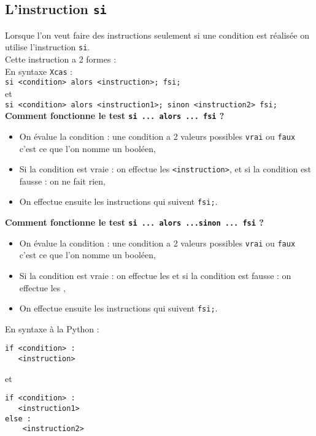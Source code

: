 \documentclass[12pt,a4paper]{book}
\begin{document}
\begin{giacjshere}
\section{L'instruction {\tt si}}\label{sec:Prix}
Lorsque l'on veut faire des instructions seulement si une condition est 
r\'ealis\'ee on utilise l'instruction {\tt si}.\\
Cette instruction a 2 formes :\\
En syntaxe {\tt Xcas} :\\
{\tt si <condition> alors <instruction>; fsi;}\\
et\\
 {\tt si <condition> alors <instruction1>; sinon <instruction2> fsi;}\\
{\bf Comment fonctionne le test {\tt si ... alors ... fsi} ?}
\begin{itemize}
\item On \'evalue la condition : une condition a 2 valeurs possibles {\tt vrai}
 ou {\tt faux} c'est ce que l'on nomme un bool\'een,
\item Si la condition est vraie : on effectue les {\tt <instruction>},
et  si la condition est fausse : on ne fait rien,
\item On effectue ensuite les instructions qui suivent {\tt fsi;}.
\end{itemize}
{\bf Comment fonctionne le test {\tt si ... alors ...sinon ... fsi} ?}
\begin{itemize}
\item On \'evalue la condition : une condition a 2 valeurs possibles {\tt vrai}
 ou {\tt faux} c'est ce que l'on nomme un bool\'een,
\item Si la condition est vraie : on effectue les {\tt <instruction1>} et  si 
la condition est fausse : on effectue les {\tt <instruction2>},
\item On effectue ensuite les instructions qui suivent {\tt fsi;}.
\end{itemize}
En syntaxe \`a la Python :
\begin{verbatim}
if <condition> : 
   <instruction>
\end{verbatim}
et
\begin{verbatim}
if <condition> : 
   <instruction1>
else :
    <instruction2>
\end{verbatim}


\end{giacjshere}
\end{document}
